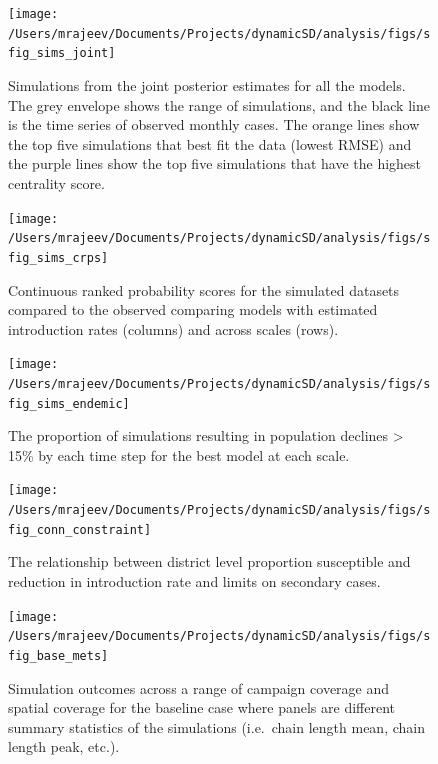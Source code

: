 \documentclass[
  oneside]{book}
\begin{document}
\begin{figure}
\texttt{[image: /Users/mrajeev/Documents/Projects/dynamicSD/analysis/figs/sfig\_sims\_joint]} \caption[Simulations from the joint posterior estimates for all the models.]{Simulations from the joint posterior estimates for all the models. The grey envelope shows the range of simulations, and the black line is the time series of observed monthly cases. The orange lines show the top five simulations that best fit the data (lowest RMSE) and the purple lines show the top five simulations that have the highest centrality score.}\label{fig:sfig-sims-joint}
\end{figure}



\begin{figure}
\texttt{[image: /Users/mrajeev/Documents/Projects/dynamicSD/analysis/figs/sfig\_sims\_crps]} \caption{Continuous ranked probability scores for the simulated datasets compared to the observed comparing models with estimated introduction rates (columns) and across scales (rows).}\label{fig:sfig-sims-crps}
\end{figure}



\begin{figure}
\texttt{[image: /Users/mrajeev/Documents/Projects/dynamicSD/analysis/figs/sfig\_sims\_endemic]} \caption{The proportion of simulations resulting in population declines \textgreater{} 15\% by each time step for the best model at each scale.}\label{fig:sfig-sims-endemic}
\end{figure}



\begin{figure}
\texttt{[image: /Users/mrajeev/Documents/Projects/dynamicSD/analysis/figs/sfig\_conn\_constraint]} \caption{The relationship between district level proportion susceptible and reduction in introduction rate and limits on secondary cases.}\label{fig:sfig-conn-constraint}
\end{figure}



\begin{figure}
\texttt{[image: /Users/mrajeev/Documents/Projects/dynamicSD/analysis/figs/sfig\_base\_mets]} \caption{Simulation outcomes across a range of campaign coverage and spatial coverage for the baseline case where panels are different summary statistics of the simulations (i.e.~chain length mean, chain length peak, etc.).}\label{fig:sfig-base-mets}
\end{figure}
\end{document}

